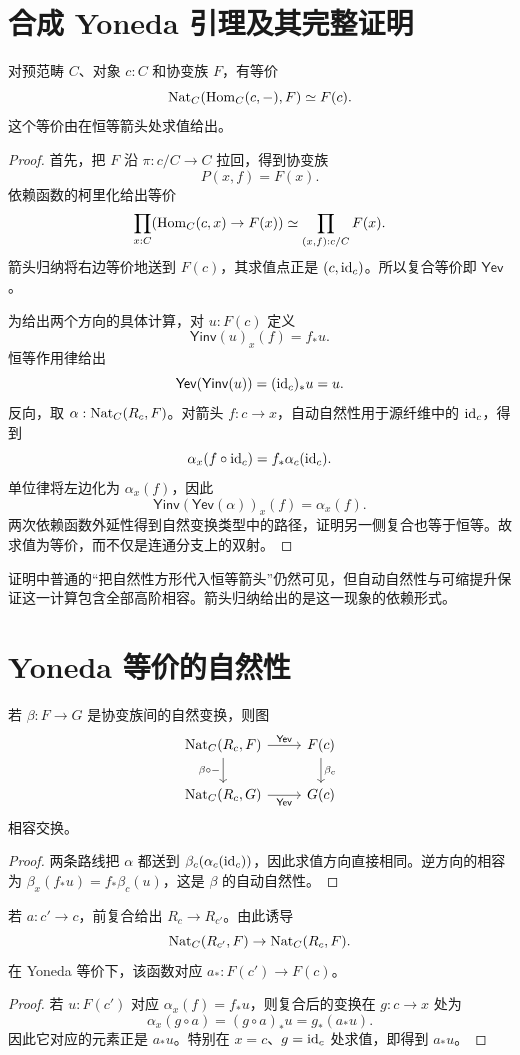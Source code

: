 \section{合成 Yoneda 引理及其完整证明}
\begin{theorem}[协变 Yoneda 引理]\label{thm:synthetic-yoneda}
对预范畴 $C$、对象 $c:C$ 和协变族 $F$，有等价
\[
\operatorname{Nat}_C(\operatorname{Hom}_C(c,-),F)\simeq F(c).
\]
这个等价由在恒等箭头处求值给出。
\end{theorem}
\begin{proof}
首先，把 $F$ 沿 $\pi:c/C\to C$ 拉回，得到协变族
\[
P(x,f)=F(x).
\]
依赖函数的柯里化给出等价
\[
\prod_{x:C}(\operatorname{Hom}_C(c,x)\to F(x))
\simeq
\prod_{(x,f):c/C}F(x).
\]
箭头归纳将右边等价地送到 $F(c)$，其求值点正是 $(c,\operatorname{id}_c)$。所以复合等价即 $\mathsf{Yev}$。

为给出两个方向的具体计算，对 $u:F(c)$ 定义
\[
\mathsf{Yinv}(u)_x(f)=f_*u.
\]
恒等作用律给出
\[
\mathsf{Yev}(\mathsf{Yinv}(u))
=(\operatorname{id}_c)_*u=u.
\]
反向，取 $\alpha:\operatorname{Nat}_C(R_c,F)$。对箭头 $f:c\to x$，自动自然性用于源纤维中的 $\operatorname{id}_c$，得到
\[
\alpha_x(f\circ\operatorname{id}_c)=f_*\alpha_c(\operatorname{id}_c).
\]
单位律将左边化为 $\alpha_x(f)$，因此
\[
\mathsf{Yinv}(\mathsf{Yev}(\alpha))_x(f)=\alpha_x(f).
\]
两次依赖函数外延性得到自然变换类型中的路径，证明另一侧复合也等于恒等。故求值为等价，而不仅是连通分支上的双射。
\end{proof}
\begin{remark}
证明中普通的“把自然性方形代入恒等箭头”仍然可见，但自动自然性与可缩提升保证这一计算包含全部高阶相容。箭头归纳给出的是这一现象的依赖形式。
\end{remark}

\section{Yoneda 等价的自然性}
\begin{proposition}[关于族的自然性]
若 $\beta:F\to G$ 是协变族间的自然变换，则图
\[
\begin{tikzcd}
\Nat_C(R_c,F)\ar[r,"\mathsf{Yev}"]\ar[d,"\beta\circ-"']&F(c)\ar[d,"\beta_c"]\\
\Nat_C(R_c,G)\ar[r,"\mathsf{Yev}"']&G(c)
\end{tikzcd}
\]
相容交换。
\end{proposition}
\begin{proof}
两条路线把 $\alpha$ 都送到 $\beta_c(\alpha_c(\operatorname{id}_c))$，因此求值方向直接相同。逆方向的相容为
$\beta_x(f_*u)=f_*\beta_c(u)$，这是 $\beta$ 的自动自然性。
\end{proof}
\begin{proposition}[关于表示对象的自然性]
若 $a:c'\to c$，前复合给出 $R_c\to R_{c'}$。由此诱导
\[
\operatorname{Nat}_C(R_{c'},F)\to\operatorname{Nat}_C(R_c,F).
\]
在 Yoneda 等价下，该函数对应 $a_*:F(c')\to F(c)$。
\end{proposition}
\begin{proof}
若 $u:F(c')$ 对应 $\alpha_x(f)=f_*u$，则复合后的变换在 $g:c\to x$ 处为
\[
\alpha_x(g\circ a)=(g\circ a)_*u=g_*(a_*u).
\]
因此它对应的元素正是 $a_*u$。特别在 $x=c$、$g=\operatorname{id}_c$ 处求值，即得到 $a_*u$。
\end{proof}

